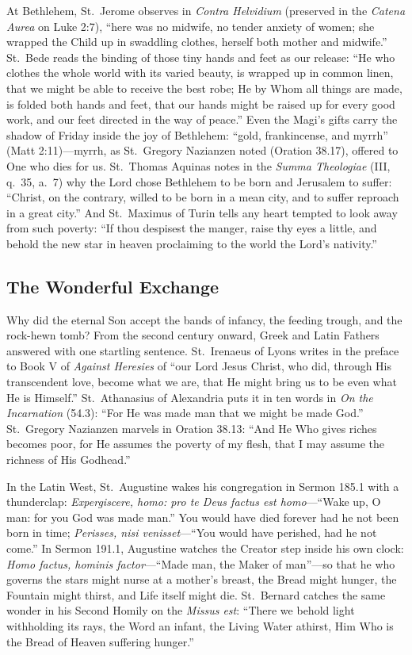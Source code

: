 At Bethlehem, St.~Jerome observes in \textit{Contra Helvidium} (preserved in
the \textit{Catena Aurea} on Luke 2:7), ``here was no midwife, no tender
anxiety of women; she wrapped the Child up in swaddling clothes, herself both
mother and midwife.'' St.~Bede reads the binding of those tiny hands and feet
as our release: ``He who clothes the whole world with its varied beauty, is
wrapped up in common linen, that we might be able to receive the best robe; He
by Whom all things are made, is folded both hands and feet, that our hands
might be raised up for every good work, and our feet directed in the way of
peace.'' Even the Magi's gifts carry the shadow of Friday inside the joy of
Bethlehem: ``gold, frankincense, and myrrh'' (Matt 2:11)---myrrh, as
St.~Gregory Nazianzen noted (Oration 38.17), offered to One who dies for us.
St.~Thomas Aquinas notes in the \textit{Summa Theologiae} (III, q.~35, a.~7)
why the Lord chose Bethlehem to be born and Jerusalem to suffer: ``Christ, on
the contrary, willed to be born in a mean city, and to suffer reproach in a
great city.'' And St.~Maximus of Turin tells any heart tempted to look away
from such poverty: ``If thou despisest the manger, raise thy eyes a little, and
behold the new star in heaven proclaiming to the world the Lord's nativity.''

\subsection{The Wonderful Exchange}

Why did the eternal Son accept the bands of infancy, the feeding trough, and
the rock-hewn tomb? From the second century onward, Greek and Latin Fathers
answered with one startling sentence. St.~Irenaeus of Lyons writes in the
preface to Book V of \textit{Against Heresies} of ``our Lord Jesus Christ, who
did, through His transcendent love, become what we are, that He might bring us
to be even what He is Himself.'' St.~Athanasius of Alexandria puts it in ten
words in \textit{On the Incarnation} (54.3): ``For He was made man that we
might be made God.'' St.~Gregory Nazianzen marvels in Oration 38.13: ``And He
Who gives riches becomes poor, for He assumes the poverty of my flesh, that I
may assume the richness of His Godhead.''

In the Latin West, St.~Augustine wakes his congregation in Sermon 185.1 with a
thunderclap: \textit{Expergiscere, homo: pro te Deus factus est homo}---``Wake
up, O man: for you God was made man.'' You would have died forever had he not
been born in time; \textit{Perisses, nisi venisset}---``You would have perished,
had he not come.'' In Sermon 191.1, Augustine watches the Creator step inside
his own clock: \textit{Homo factus, hominis factor}---``Made man, the Maker of
man''---so that he who governs the stars might nurse at a mother's breast, the
Bread might hunger, the Fountain might thirst, and Life itself might die.
St.~Bernard catches the same wonder in his Second Homily on the \textit{Missus
est}: ``There we behold light withholding its rays, the Word an infant, the
Living Water athirst, Him Who is the Bread of Heaven suffering hunger.''

